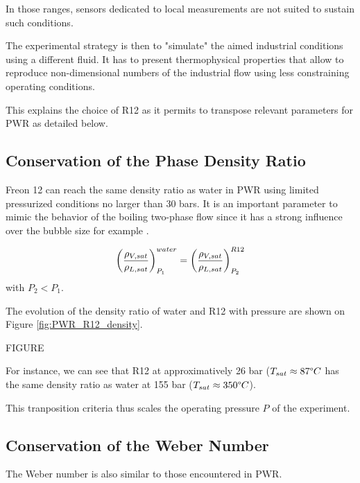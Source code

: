 In those ranges, sensors dedicated to local measurements are not suited to sustain such conditions. 

\npar

The experimental strategy is then to "simulate" the aimed industrial conditions using a different fluid. It has to present thermophysical properties that allow to reproduce non-dimensional numbers of the industrial flow using less constraining operating conditions.

\npar

This explains the choice of R12 as it permits to transpose relevant parameters for PWR as detailed below.

\subsection{Conservation of the Phase Density Ratio}


Freon 12 can reach the same density ratio as water in PWR using limited pressurized conditions no larger than 30 bars. It is an important parameter to mimic the behavior of the boiling two-phase flow since it has a strong influence over the bubble size for example \cite{kocamustafaogullari_pressure_1983}.

\begin{equation}
\left( \frac{\rho_{V,sat}}{\rho_{L,sat}} \right)_{P_{1}}^{water} = \left( \frac{\rho_{V,sat}}{\rho_{L,sat}} \right)_{P_{2}}^{R12}
\end{equation} 
with $P_{2} < P_{1}$.

\npar

The evolution of the density ratio of water and R12 with pressure are shown on Figure \ref{fig:PWR_R12_density}.

FIGURE


For instance, we can see that R12 at approximatively 26 bar ($T_{sat} \approx 87 \degree C$ has the same density ratio as water at 155 bar ($T_{sat} \approx 350 \degree C$).

\npar

\begin{note*}{}
This tranposition criteria thus scales the operating pressure $P$ of the experiment.
\end{note*}

\subsection{Conservation of the Weber Number}

The Weber number is also similar to those encountered in PWR.

